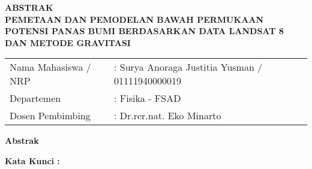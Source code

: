 \newpage

\begin{center}
	\textbf{ABSTRAK}\\
	\vskip 20pt
	\textbf{PEMETAAN DAN PEMODELAN BAWAH PERMUKAAN POTENSI PANAS BUMI BERDASARKAN DATA LANDSAT 8 DAN METODE GRAVITASI}
	\vskip 20pt
\end{center}

\begin{table}[h]
	\begin{tabular}{ll}
		Nama Mahasiswa / NRP &: Surya Anoraga Justitia Yusman / 01111940000019\\
		Departemen &: Fisika - FSAD\\
		Dosen Pembimbing &: Dr.rer.nat. Eko Minarto
	\end{tabular}
\end{table}

\vskip 10pt
\textbf{Abstrak}
\vskip 5pt
\hspace{25pt} 

\vskip 10pt
\textbf{Kata Kunci :} 

\restoregeometry